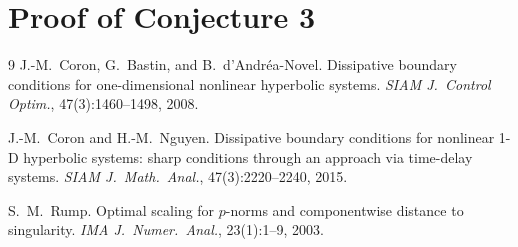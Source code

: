 \documentclass{article}
\begin{document}


\section{Proof of Conjecture 3}
\label{sec:conclusion}



\begin{thebibliography}{9}
J.-M.\ Coron, G.\ Bastin, and B.\ d'Andr\'ea-Novel.
Dissipative boundary conditions for one-dimensional nonlinear hyperbolic systems.
\textit{SIAM J.\ Control Optim.}, 47(3):1460--1498, 2008.

J.-M.\ Coron and H.-M.\ Nguyen.
Dissipative boundary conditions for nonlinear 1-D hyperbolic systems: sharp conditions through an approach via time-delay systems.
\textit{SIAM J.\ Math.\ Anal.}, 47(3):2220--2240, 2015.

S.\ M.\ Rump.
Optimal scaling for $p$-norms and componentwise distance to singularity.
\textit{IMA J.\ Numer.\ Anal.}, 23(1):1--9, 2003.
\end{thebibliography}
\end{document}
